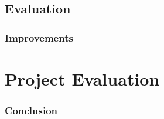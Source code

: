 \documentclass{beamer}
\begin{document}
\subsection{Evaluation}

\begin{frame}
\frametitle{Improvements}





\end{frame}


\section*{Project Evaluation}
\begin{frame}

\frametitle{Conclusion}





\end{frame}
\end{document}
